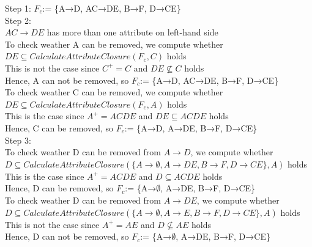 \documentclass[]{article}
\begin{document}
	\noindent Step 1: $F_{c}$:= \{A→D, AC→DE, B→F, D→CE\}    \\
	
	\noindent Step 2: \\
	
	$AC\rightarrow DE$ has more than one attribute on left-hand side\\
	
	To check weather A can be removed, we compute whether $DE\subseteq CalculateAttributeClosure(F_{c}, C)$ holds \\
	
	This is not the case since $C^{+} = C$ and $DE\not\subseteq C$ holds  \\
	
	Hence, A can not be removed, so $F_{c}$:= \{A→D, AC→DE, B→F, D→CE\} \\
	
	To check weather C can be removed, we compute whether $DE\subseteq CalculateAttributeClosure(F_{c}, A)$ holds \\
	
	This is the case since $A^{+} = ACDE$ and $DE\subseteq ACDE$ holds  \\
	
	Hence, C can be removed, so $F_{c}$:= \{A→D, A→DE, B→F, D→CE\} \\
	
	\noindent Step 3:  \\
	
	To check weather D can be removed from $A\rightarrow D$, we compute whether $D\subseteq CalculateAttributeClosure(\{A\rightarrow \emptyset, A\rightarrow DE, B\rightarrow F, D\rightarrow CE\}, A)$ holds \\
	
	This is the case since $A^{+} = ACDE$ and $D\subseteq ACDE$ holds  \\
	
	Hence, D can be removed, so $F_{c}$:= \{A→$\emptyset$, A→DE, B→F, D→CE\} \\
	
	To check weather D can be removed from $A\rightarrow DE$, we compute whether $D\subseteq CalculateAttributeClosure(\{A\rightarrow \emptyset, A\rightarrow E, B\rightarrow F, D\rightarrow CE\}, A)$ holds \\
	
	This is not the case since $A^{+} = AE$ and $D\not\subseteq AE$ holds  \\
	
	Hence, D can not be removed, so $F_{c}$:= \{A→$\emptyset$, A→DE, B→F, D→CE\} \\
	
\end{document}
